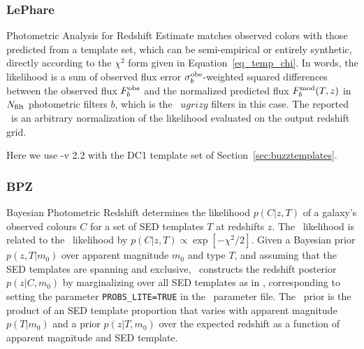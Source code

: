 \subsubsection{LePhare}
\label{sec:lephare}

Photometric Analysis for Redshift Estimate \citep[\lephare\footnote{\url{http://www.cfht.hawaii.edu/~arnouts/lephare.html}},][]{Arnouts:99,Ilbert:06} matches observed colors with those predicted from a template set, which can be semi-empirical or entirely synthetic, directly according to the $\chi^2$ form given in Equation~\ref{eq_temp_chi}.
In words, the likelihood is a sum of observed flux error $\sigma_{b}^{\rm{obs}}$-weighted squared differences between the observed flux $F^{\rm{obs}}_{b}$ and the normalized predicted flux $F^{\rm{mod}}_{b}(T, z)$ in $N_{\rm{filt}}$ photometric filters $b$, which is the \lsst\ $ugrizy$ filters in this case.
The reported \pzpdf\ is an arbitrary normalization of the likelihood evaluated on the output redshift grid.

Here we use \lephare-v 2.2 with the DC1 template set of Section~\ref{sec:buzztemplates}.

\subsubsection{BPZ}
\label{sec:BPZ}

Bayesian Photometric Redshift \citep[\bpz\footnote{\url{http://www.stsci.edu/~dcoe/BPZ/}},][]{Benitez:00} determines the likelihood $p(C \vert z, T)$ of a galaxy's observed colours $C$ for a set of SED templates $T$ at redshifts $z$.
The \bpz\ likelihood is related to the \chisq\ likelihood by $p(C \vert z, T) \propto \exp[- \chi^{2} / 2]$.
Given a Bayesian prior $p(z, T \vert m_{0})$ over apparent magnitude $m_0$ and type $T$, and assuming that the SED templates are spanning and exclusive, \bpz\ constructs the redshift posterior $p(z \vert C, m_0)$ by marginalizing over all SED templates as in \citep[Eq.~3 from][]{Benitez:00}, corresponding to setting the parameter \texttt{PROBS\_LITE=TRUE} in the \bpz\ parameter file.
The \bpz\ prior is the product of an SED template proportion that varies with apparent magnitude $p(T \vert m_{0})$ and a prior $p(z \vert T, m_{0})$ over the expected redshift as a function of apparent magnitude and SED template.

